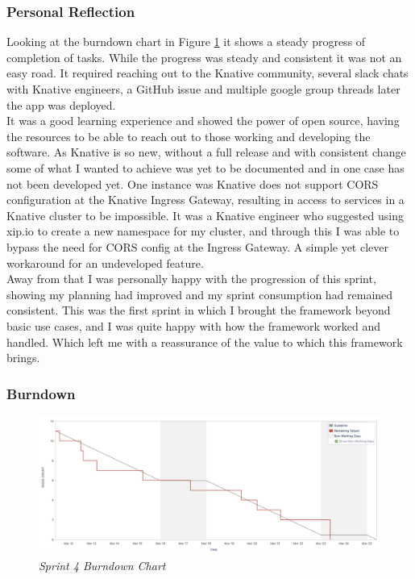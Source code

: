 \subsubsection{Personal Reflection}
Looking at the burndown chart in Figure \ref{img:bd4} it shows a steady progress of completion of tasks. While the progress was steady and consistent it was not an easy road. It required reaching out to the Knative community, several slack chats with Knative engineers, a GitHub issue and multiple google group threads later the app was deployed. 
\\It was a good learning experience and showed the power of open source, having the resources to be able to reach out to those working and developing the software. As Knative is so new, without a full release and with consistent change some of what I wanted to achieve was yet to be documented and in one case has not been developed yet. One instance was Knative does not support CORS configuration at the Knative Ingress Gateway, resulting in access to services in a Knative cluster to be impossible. It was a Knative engineer who suggested using xip.io to create a new namespace for my cluster, and through this I was able to bypass the need for CORS config at the Ingress Gateway. A simple yet clever workaround for an undeveloped feature.
\\Away from that I was personally happy with the progression of this sprint, showing my planning had improved and my sprint consumption had remained consistent. This was the first sprint in which I brought the framework beyond basic use cases, and I was quite happy with how the framework worked and handled. Which left me with a reassurance of the value to which this framework brings.
\subsubsection{Burndown}
\begin{figure}[!ht]
\centering
\includegraphics*[width=0.8
\textwidth]{images/sprint-4.png}
\caption{\em Sprint 4 Burndown Chart}
\label{img:bd4}
\end{figure}
